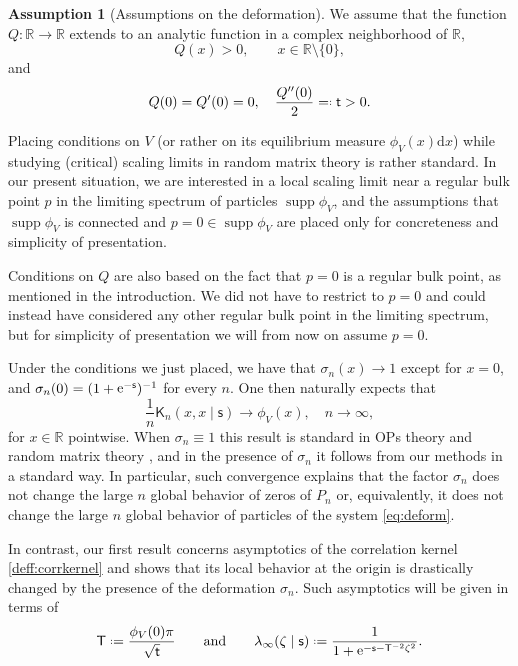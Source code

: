 \documentclass[reqno,a4paper,11pt]{amsart}
\DeclareMathOperator{\ee}{\rm e}
\DeclareMathOperator{\supp}{supp}
\newcommand{\R}{\mathbb{R}}
\newcommand{\dd}{\mathrm{d}}
\newcommand{\msf}{\mathsf}
\newcommand{\tad}{\msf t}
\newcommand{\sad}{\msf s}
\theoremstyle{definition}
\newtheorem{assumption}[theorem]{Assumption}
\theoremstyle{remark}
\numberwithin{equation}{section}
\newcommand*{\defeq}{\mathrel{\vcenter{\baselineskip0.5ex \lineskiplimit0pt
                     \hbox{\scriptsize.}\hbox{\scriptsize.}}}%
                     =}
\newcommand*{\eqdef}{=\mathrel{\vcenter{\baselineskip0.5ex \lineskiplimit0pt
                     \hbox{\scriptsize.}\hbox{\scriptsize.}}}%
                     }
\begin{document}
\begin{assumption}[Assumptions on the deformation]\label{asump:Q}    
We assume that the function $Q:\R\to \R$ extends to an analytic function in a complex neighborhood of $\R$,
%
\begin{equation}\label{eq:behQorigin}
Q(x)>0 , \qquad x \in \R \setminus \{0\},
\end{equation}
and 
\begin{equation}\label{eq:asyQ}
    Q(0) =Q'(0)=0,\quad \frac{Q''(0)}{2} \eqdef \msf t >0.
\end{equation}
\end{assumption}

Placing conditions on $V$ (or rather on its equilibrium measure $\phi_V(x)\dd x$) while studying (critical) scaling limits in random matrix theory is rather standard. In our present situation, we are interested in a local scaling limit near a regular bulk point $p$ in the limiting spectrum of particles $\supp\phi_V$, and the assumptions that $\supp\phi_V$ is connected and $p=0\in \supp\phi_V$ are placed only for concreteness and simplicity of presentation. 

Conditions on $Q$ are also based on the fact that $p=0$ is a regular bulk point, as mentioned in the introduction. We did not have to restrict to $p=0$ and could instead have considered any other regular bulk point in the limiting spectrum, but for simplicity of presentation we will from now on assume $p=0$. 

Under the conditions we just placed, we have that $\sigma_n(x)\to 1$ except for $x=0$, and $\sigma_n(0)=(1+\ee^{-\sad})^{-1}$ for every $n$. One then naturally expects that
%
$$
\frac{1}{n}\msf K_n(x,x\mid \sad)\to \phi_V(x),\quad n\to \infty,
$$
%
for $x\in \R$ pointwise. When $\sigma_n\equiv 1$ this result is standard in OPs theory and random matrix theory \cite{johansson_1998, Saff_book, Martinez-Finkelshtein-lecturenotes-2006}, and in the presence of $\sigma_n$ it follows from our methods in a standard way. In particular, such convergence explains that the factor $\sigma_n$ does not change the large $n$ global behavior of zeros of $P_n$ or, equivalently, it does not change the large $n$ global behavior of particles of the system \eqref{eq:deform}. 

In contrast, our first result concerns asymptotics of the correlation kernel \eqref{deff:corrkernel} and shows that its local behavior at the origin is drastically changed by the presence of the deformation $\sigma_n$. Such asymptotics will be given in terms of
%
\begin{equation}\label{eq:lambdainftyTdeffintro}
\msf T \defeq 
    \frac{ \phi_V(0)\pi}{\sqrt{\tad}}\qquad \text{and}\qquad 
    \lambda_\infty(\zeta \mid \sad) \defeq \frac{1}{1 + \ee^{- \sad - \msf T^{-2} \zeta^2}}.
\end{equation}
\end{document}
